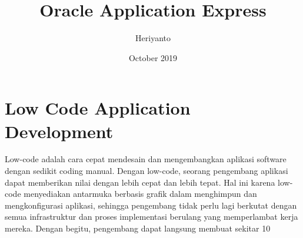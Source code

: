 \documentclass[12pt, times new roman]{article}
\title{Oracle Application Express}
\author{Heriyanto}
\date{October 2019}
\begin{document}
\maketitle
\section{Low Code Application Development}
Low-code adalah cara cepat mendesain dan mengembangkan aplikasi software dengan sedikit coding manual. Dengan low-code, seorang pengembang aplikasi dapat memberikan nilai dengan lebih cepat dan lebih tepat. Hal ini karena low-code menyediakan antarmuka berbasis grafik dalam menghimpun dan mengkonfigurasi aplikasi, sehingga pengembang tidak perlu lagi berkutat dengan semua infrastruktur dan proses implementasi berulang yang memperlambat kerja mereka. Dengan begitu, pengembang dapat langsung membuat sekitar 10%
\end{document}
